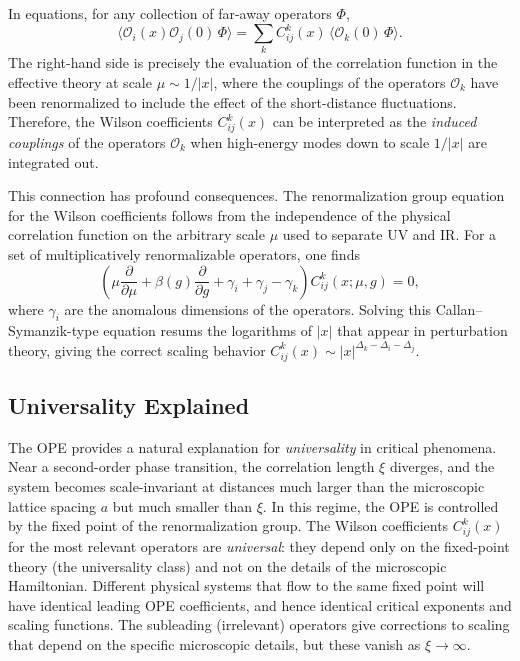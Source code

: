 \documentclass[11pt]{article}
\begin{document}
In equations, for any collection of far-away operators $\Phi$,
\begin{equation}
\langle \mathcal{O}_i(x) \mathcal{O}_j(0) \, \Phi \rangle = \sum_k C_{ij}^k(x) \, \langle \mathcal{O}_k(0) \, \Phi \rangle .
\label{eq:OPEcorrel}
\end{equation}
The right-hand side is precisely the evaluation of the correlation function in the effective theory at scale $\mu \sim 1/|x|$, where the couplings of the operators $\mathcal{O}_k$ have been renormalized to include the effect of the short-distance fluctuations. Therefore, the Wilson coefficients $C_{ij}^k(x)$ can be interpreted as the \emph{induced couplings} of the operators $\mathcal{O}_k$ when high-energy modes down to scale $1/|x|$ are integrated out.

This connection has profound consequences. The renormalization group equation for the Wilson coefficients follows from the independence of the physical correlation function on the arbitrary scale $\mu$ used to separate UV and IR. For a set of multiplicatively renormalizable operators, one finds
\begin{equation}
\left( \mu \frac{\partial}{\partial \mu} + \beta(g) \frac{\partial}{\partial g} + \gamma_i + \gamma_j - \gamma_k \right) C_{ij}^k(x;\mu,g) = 0,
\label{eq:RGE}
\end{equation}
where $\gamma_i$ are the anomalous dimensions of the operators. Solving this Callan--Symanzik-type equation resums the logarithms of $|x|$ that appear in perturbation theory, giving the correct scaling behavior $C_{ij}^k(x) \sim |x|^{\Delta_k - \Delta_i - \Delta_j}$.

\subsection{Universality Explained}
The OPE provides a natural explanation for \emph{universality} in critical phenomena. Near a second-order phase transition, the correlation length $\xi$ diverges, and the system becomes scale-invariant at distances much larger than the microscopic lattice spacing $a$ but much smaller than $\xi$. In this regime, the OPE is controlled by the fixed point of the renormalization group. The Wilson coefficients $C_{ij}^k(x)$ for the most relevant operators are \emph{universal}: they depend only on the fixed-point theory (the universality class) and not on the details of the microscopic Hamiltonian. Different physical systems that flow to the same fixed point will have identical leading OPE coefficients, and hence identical critical exponents and scaling functions. The subleading (irrelevant) operators give corrections to scaling that depend on the specific microscopic details, but these vanish as $\xi \to \infty$.
\end{document}
